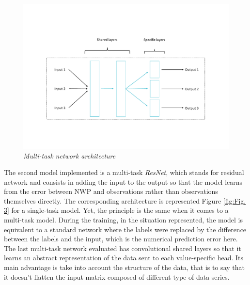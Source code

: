 \documentclass{article}
\newcommand{\saut}{\vspace{10px}}
\begin{document}
\begin{figure}[H]
    \centering
    \includegraphics[width=.9\linewidth]{img/heads.pdf}
    \vspace{-30px}
    \caption{\textit{Multi-task network architecture}}
    \label{fig:Fig. 2}
\end{figure}


\saut

The second model implemented is a multi-task \emph{ResNet}, which stands for residual network and consists in adding
the input to the output so that the model learns from the error between NWP and observations rather than observations
themselves directly. The corresponding architecture is represented Figure \ref{fig:Fig. 3} for a single-task model. Yet,
the principle is the same when it comes to a multi-task model. During the training, in the situation represented,
the model is equivalent to a standard network where the labels were replaced by the difference between the
labels and the input, which is the numerical prediction error here.
The last multi-task network evaluated has convolutional shared layers so that it learns an abstract representation of the
data sent to each value-specific head. Its main advantage is take into account the structure of the data, that is to say
that it doesn't flatten the input matrix composed of different type of data series.

\vspace{-30px}
\end{document}
